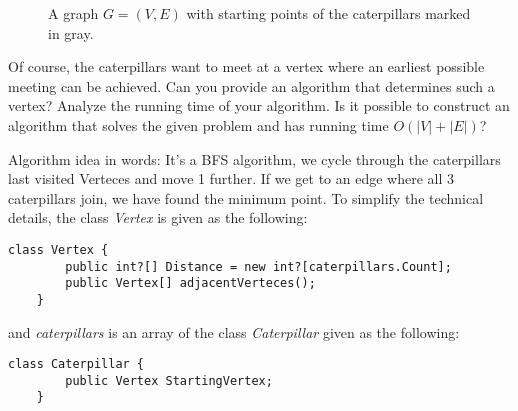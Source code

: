 \documentclass[12pt, a4]{article}
\begin{document}
 \begin{figure}[h]
 	\centering
	\caption{A graph $G= (V, E)$ with starting points of the caterpillars marked in gray.}
	\label{fig:graph_caterpillar}
\end{figure}
 
 Of course, the caterpillars want to meet at a vertex where an earliest possible meeting can be achieved. Can you provide an algorithm that determines such a vertex?  Analyze the running time of your algorithm. Is it possible to construct an algorithm that solves the given problem and has running time $O(|V|+|E|)$?
 

 Algorithm idea in words:
 It's a BFS algorithm, we cycle through the caterpillars last visited Verteces and move 1 further. If we get to an edge where all 3 caterpillars join, we have found the minimum point. To simplify the technical details, the class \emph{Vertex} is given as the following:
 \begin{lstlisting}[language={[Sharp]c}] 		
 	class Vertex {
 		public int?[] Distance = new int?[caterpillars.Count];
 		public Vertex[] adjacentVerteces();
 	}
 \end{lstlisting}
and \emph{caterpillars} is an array of the class \emph{Caterpillar} given as the following:
 \begin{lstlisting}[language={[Sharp]c}] 		
	class Caterpillar {
		public Vertex StartingVertex;
	}
\end{lstlisting}
\end{document}
